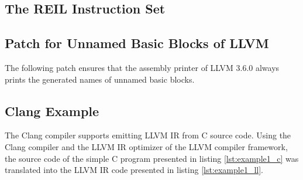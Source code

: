 
\clearpage


\subsection{The REIL Instruction Set}
\label{app:reil_instructions}



\clearpage


\subsection{Patch for Unnamed Basic Blocks of LLVM}
\label{app:unnamed_patch}

The following patch ensures that the assembly printer of LLVM 3.6.0 always prints the generated names of unnamed basic blocks.



\clearpage


\subsection{Clang Example}
\label{app:clang_example}

The Clang compiler supports emitting LLVM IR from C source code. Using the Clang compiler and the LLVM IR optimizer of the LLVM compiler framework, the source code of the simple C program presented in listing \ref{lst:example1_c} was translated into the LLVM IR code presented in listing \ref{lst:example1_ll}.



